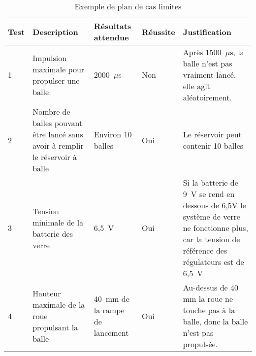 \begin{landscape}
    \begin{table}[h!]
        \centering
        \caption{Exemple de plan de cas limites}
        \begin{tabular}{p{0.5in}p{2in}p{1.5in}p{0.75in}p{3in}}
            \hline
            \bfseries Test & \bfseries Description & \bfseries Résultats attendue & \bfseries Réussite & \bfseries Justification \\
            \hline\hline
            1 & Impulsion maximale pour propulser une balle & 2000~$\mu$s & Non & Après 1500~$\mu$s, la balle n’est pas vraiment lancé, elle agit aléatoirement. \\
            2 & Nombre de balles pouvant être lancé sans avoir à remplir le réservoir à balle & Environ 10 balles & Oui & Le réservoir peut contenir 10 balles \\
            3 & Tension minimale de la batterie des verre & 6,5~V & Oui & Si la batterie de 9~V se rend en dessous de 6,5V le système de verre ne fonctionne plus, car la tension de référence des régulateurs est de 6,5~V \\
            4 & Hauteur maximale de la roue propulsant la balle & 40~mm de la rampe de lancement & Oui & Au-dessus de 40 mm la roue ne touche pas à la balle, donc la balle n’est pas propulsée. \\
            \hline
        \end{tabular}
        \label{tab:s3-test-cas-limites}
    \end{table}
\end{landscape}
